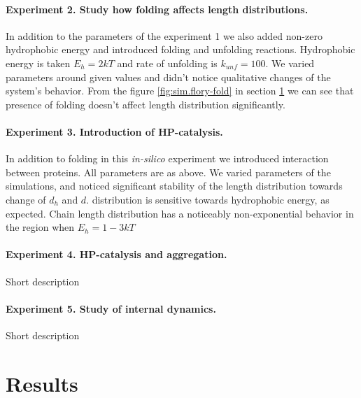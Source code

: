 \documentclass[12pt]{paper}
\begin{document}
\paragraph{Experiment 2. Study how folding affects length distributions.}
In addition to the parameters of the  experiment 1 we also added non-zero hydrophobic energy and 
introduced folding and unfolding reactions.
 Hydrophobic energy is taken $E_h=2kT$ and rate of unfolding is $k_{unf}=100$. We varied parameters 
around given values and didn't notice qualitative changes of the system's behavior.
From the figure \ref{fig:sim.flory-fold} in section \ref{sec:res} we can see 
that presence of folding doesn't affect length distribution significantly.

\paragraph{Experiment 3. Introduction of HP-catalysis.}
In addition to folding in this \textit{in-silico} experiment we introduced interaction between 
proteins. All parameters are as above. We varied parameters of the simulations, and noticed 
significant stability of the length distribution towards change of $d_h$ and $d$. distribution is 
sensitive towards hydrophobic energy, as expected. Chain length distribution has a noticeably 
non-exponential behavior in the region when $E_h= 1-3 kT$

\paragraph{Experiment 4. HP-catalysis and aggregation.}
Short description


\paragraph{Experiment 5. Study of internal dynamics.}
Short description




\section{Results}\label{sec:res}
\end{document}
